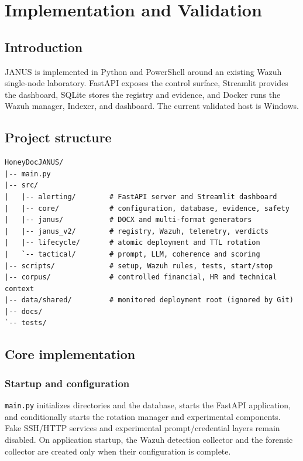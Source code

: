 \chapter{Implementation and Validation}

\section{Introduction}

JANUS is implemented in Python and PowerShell around an existing Wazuh
single-node laboratory. FastAPI exposes the control surface, Streamlit provides
the dashboard, SQLite stores the registry and evidence, and Docker runs the
Wazuh manager, Indexer, and dashboard. The current validated host is Windows.

\section{Project structure}

\begin{lstlisting}[caption={Simplified JANUS source tree},label={lst:tree}]
HoneyDocJANUS/
|-- main.py
|-- src/
|   |-- alerting/        # FastAPI server and Streamlit dashboard
|   |-- core/            # configuration, database, evidence, safety
|   |-- janus/           # DOCX and multi-format generators
|   |-- janus_v2/        # registry, Wazuh, telemetry, verdicts
|   |-- lifecycle/       # atomic deployment and TTL rotation
|   `-- tactical/        # prompt, LLM, coherence and scoring
|-- scripts/             # setup, Wazuh rules, tests, start/stop
|-- corpus/              # controlled financial, HR and technical context
|-- data/shared/         # monitored deployment root (ignored by Git)
|-- docs/
`-- tests/
\end{lstlisting}

\section{Core implementation}

\subsection{Startup and configuration}

\texttt{main.py} initializes directories and the database, starts the FastAPI
application, and conditionally starts the rotation manager and experimental
components. Fake SSH/HTTP services and experimental prompt/credential layers
remain disabled. On application startup, the Wazuh detection collector and the
forensic collector are created only when their configuration is complete.

